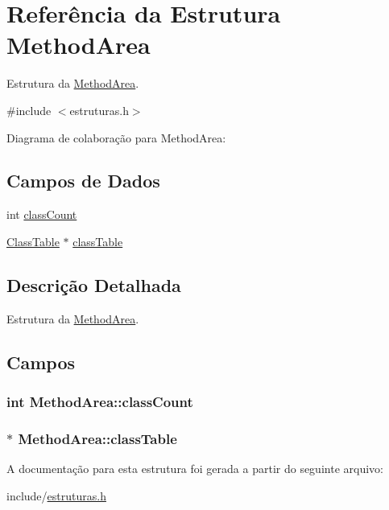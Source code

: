 \hypertarget{struct_method_area}{}\section{Referência da Estrutura Method\+Area}
\label{struct_method_area}


Estrutura da \hyperlink{struct_method_area}{Method\+Area}.  




{\ttfamily \#include $<$estruturas.\+h$>$}



Diagrama de colaboração para Method\+Area\+:
\subsection*{Campos de Dados}
\begin{DoxyCompactItemize}
\item 
int \hyperlink{struct_method_area_ad6e7303a76ee3e2814565a98f3c4b51e}{class\+Count}
\item 
\hyperlink{struct_class_table}{Class\+Table} $\ast$ \hyperlink{struct_method_area_a094a6be1d96f5aa2f510daa70672b0c6}{class\+Table}
\end{DoxyCompactItemize}


\subsection{Descrição Detalhada}
Estrutura da \hyperlink{struct_method_area}{Method\+Area}. 

\subsection{Campos}
\subsubsection[{\texorpdfstring{class\+Count}{classCount}}]{\setlength{\rightskip}{0pt plus 5cm}int Method\+Area\+::class\+Count}\hypertarget{struct_method_area_ad6e7303a76ee3e2814565a98f3c4b51e}{}\label{struct_method_area_ad6e7303a76ee3e2814565a98f3c4b51e}
\subsubsection[{\texorpdfstring{class\+Table}{classTable}}]{$\ast$ Method\+Area\+::class\+Table}\hypertarget{struct_method_area_a094a6be1d96f5aa2f510daa70672b0c6}{}\label{struct_method_area_a094a6be1d96f5aa2f510daa70672b0c6}


A documentação para esta estrutura foi gerada a partir do seguinte arquivo\+:\begin{DoxyCompactItemize}
\item 
include/\hyperlink{estruturas_8h}{estruturas.\+h}\end{DoxyCompactItemize}
